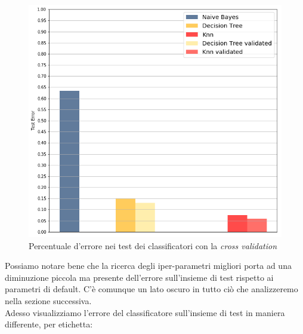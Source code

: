 \begin{figure}[H]
	\centering
	\includegraphics[width=1\linewidth]{img/test_errors_cross_validation}
	\caption{Percentuale d'errore nei test dei classificatori con la \textit{cross validation}}
	\label{fig:testerrorscrossvalidation}
\end{figure}

Possiamo notare bene che la ricerca degli iper-parametri migliori porta ad una diminuzione piccola ma presente dell'errore sull'insieme di test rispetto ai parametri di default. C'\`e comunque un lato oscuro in tutto ci\`o che analizzeremo nella sezione successiva.\\

Adesso visualizziamo l'errore del classificatore sull'insieme di test in maniera differente, per etichetta:

